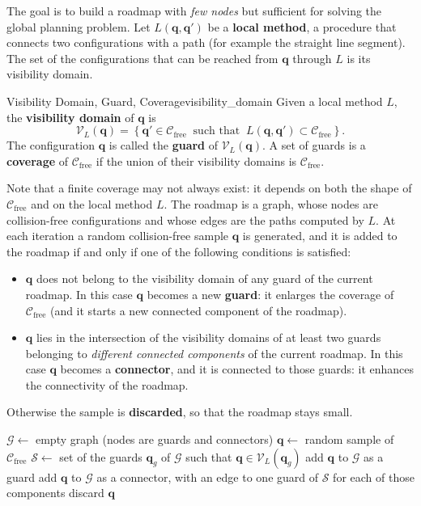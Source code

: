 \documentclass[10pt, a4paper]{report}
\newcommand{\q}{{\mathbf q}}
\begin{document}
\noindent The goal is to build a roadmap with \textit{few nodes} but sufficient for solving the global planning problem. Let $L(\q,\q')$ be a \textbf{local method}, a procedure that connects two configurations with a path (for example the straight line segment). The set of the configurations that can be reached from $\q$ through $L$ is its visibility domain.
\begin{boxdefinition}{Visibility Domain, Guard, Coverage}{visibility_domain}
    Given a local method $L$, the \textbf{visibility domain} of $\q$ is\begin{equation}
        \mathcal V_L(\q)=\left\{\q'\in\mathcal C_{\text{free}}\ \text{ such that }\ L(\q,\q')\subset\mathcal C_{\text{free}}\right\}.
    \end{equation}
    The configuration $\q$ is called the \textbf{guard} of $\mathcal V_L(\q)$. A set of guards is a \textbf{coverage} of $\mathcal C_{\text{free}}$ if the union of their visibility domains is $\mathcal C_{\text{free}}$.
\end{boxdefinition}
\noindent Note that a finite coverage may not always exist: it depends on both the shape of $\mathcal C_{\text{free}}$ and on the local method $L$. The roadmap is a graph, whose nodes are collision-free configurations and whose edges are the paths computed by $L$. At each iteration a random collision-free sample $\q$ is generated, and it is added to the roadmap if and only if one of the following conditions is satisfied:\begin{itemize}
    \item $\q$ does not belong to the visibility domain of any guard of the current roadmap. In this case $\q$ becomes a new \textbf{guard}: it enlarges the coverage of $\mathcal C_{\text{free}}$ (and it starts a new connected component of the roadmap).
    \item $\q$ lies in the intersection of the visibility domains of at least two guards belonging to \textit{different connected components} of the current roadmap. In this case $\q$ becomes a \textbf{connector}, and it is connected to those guards: it enhances the connectivity of the roadmap.
\end{itemize}
Otherwise the sample is \textbf{discarded}, so that the roadmap stays small.
\begin{algorithm}[H]
\caption{Visibility Roadmap Construction}\label{alg:visibility_roadmap}
\begin{algorithmic}[1]
\State $\mathcal G\gets$ empty graph (nodes are guards and connectors)
\Repeat
\State $\q\gets$ random sample of $\mathcal C_{\text{free}}$
\State $\mathcal S\gets$ set of the guards $\q_g$ of $\mathcal G$ such that $\q\in\mathcal V_L(\q_g)$
\State add $\q$ to $\mathcal G$ as a guard
\State add $\q$ to $\mathcal G$ as a connector, with an edge to one guard of $\mathcal S$ for each of those components
\Else
\State discard $\q$
\EndIf
{}
\end{algorithmic}
\end{algorithm}
\end{document}
